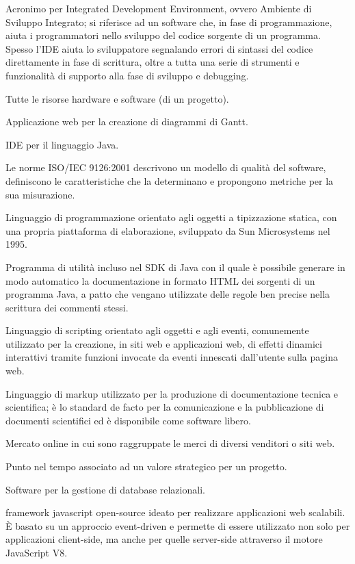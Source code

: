 \item[IDE]  Acronimo per Integrated Development Environment, ovvero Ambiente di Sviluppo Integrato; si riferisce ad un software che, in fase di programmazione, aiuta i programmatori nello sviluppo del codice sorgente di un programma. Spesso l'IDE aiuta lo sviluppatore segnalando errori di sintassi del codice direttamente in fase di scrittura, oltre a tutta una serie di strumenti e funzionalità di supporto alla fase di sviluppo e debugging.
\item[infrastruttura] Tutte le risorse hardware e software (di un progetto).
\item[Instagantt] Applicazione web per la creazione di diagrammi di Gantt.
\item[IntelliJ Idea] IDE per il linguaggio Java.
\item[ISO/IEC 9126:2001] Le norme ISO/IEC 9126:2001 descrivono un modello di qualità del software, definiscono le caratteristiche che la determinano e propongono metriche per la sua misurazione.
\item[Java] Linguaggio di programmazione orientato agli oggetti a tipizzazione statica, con una propria piattaforma di elaborazione, sviluppato da Sun Microsystems nel 1995.
\item[Javadoc] Programma di utilità incluso nel SDK di Java con il quale è possibile generare in modo automatico la documentazione in formato HTML dei sorgenti di un programma Java, a patto che vengano utilizzate delle regole ben precise nella scrittura dei commenti stessi.
\item[JavaScript] Linguaggio di scripting orientato agli oggetti e agli eventi, comunemente utilizzato per la creazione, in siti web e applicazioni web, di effetti dinamici interattivi tramite funzioni invocate da eventi innescati dall’utente sulla pagina web.
\item[Latex] Linguaggio di markup utilizzato per la produzione di documentazione tecnica e scientifica; è lo standard de facto per la comunicazione e la pubblicazione di documenti scientifici ed è disponibile come software libero.
\item[marketplace] Mercato online in cui sono raggruppate le merci di diversi venditori o siti web.
\item[milestone] Punto nel tempo associato ad un valore strategico per un progetto.
\item[MySQL] Software per la gestione di database relazionali.
\item[Node.js] framework javascript open-source ideato per realizzare applicazioni web scalabili. È basato su un approccio event-driven e permette di essere utilizzato non solo per applicazioni client-side, ma anche per quelle server-side attraverso il motore JavaScript V8.
